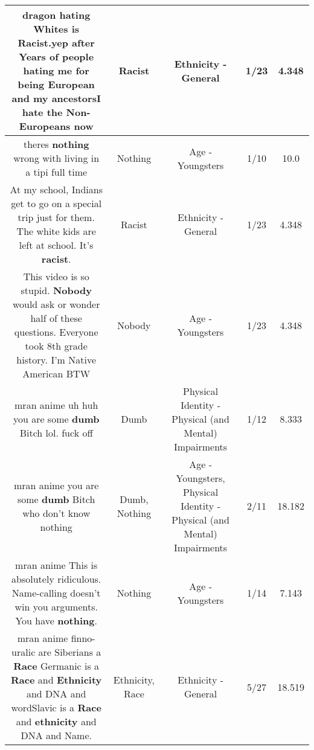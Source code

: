 \documentclass[11pt]{article}
\newlength\mylength
\begin{document}
\begin{center}
\begin{longtable}{|C{.65\mylength}|C{.30\mylength}|C{.12\mylength}|C{.12\mylength}|C{.12\mylength}|}
  \small dragon hating Whites is \textbf{Racist}.yep after Years of people hating me for being European and my ancestorsI hate the Non-Europeans now\normalsize   & Racist & Ethnicity - General & 1/23 & 4.348 \\  \hline
  \small theres \textbf{nothing} wrong with living in a tipi full time\normalsize   & Nothing & Age - Youngsters & 1/10 & 10.0 \\  \hline
  \small At my school, Indians get to go on a special trip just for them. The white kids are left at school. It's \textbf{racist}.\normalsize   & Racist & Ethnicity - General & 1/23 & 4.348 \\  \hline
  \small This video is so stupid. \textbf{Nobody} would ask or wonder half of these questions. Everyone took 8th grade history. I'm Native American BTW\normalsize   & Nobody & Age - Youngsters & 1/23 & 4.348 \\  \hline
  \small mran anime uh huh you are some \textbf{dumb} Bitch lol. fuck off\normalsize   & Dumb & Physical Identity - Physical (and Mental) Impairments & 1/12 & 8.333 \\  \hline
  \small mran anime you are some \textbf{dumb} Bitch who don't know nothing\normalsize   & Dumb, Nothing & Age - Youngsters, Physical Identity - Physical (and Mental) Impairments & 2/11 & 18.182 \\  \hline
  \small mran anime This is absolutely ridiculous. Name-calling doesn't win you arguments. You have \textbf{nothing}.\normalsize   & Nothing & Age - Youngsters & 1/14 & 7.143 \\  \hline
  \small mran anime finno-uralic are Siberians a \textbf{Race} Germanic is a \textbf{Race} and \textbf{Ethnicity} and DNA and wordSlavic is a \textbf{Race} and \textbf{ethnicity} and DNA and Name.\normalsize   & Ethnicity, Race & Ethnicity - General & 5/27 & 18.519 \\  \hline

\end{longtable}
\end{center}
\end{document}
